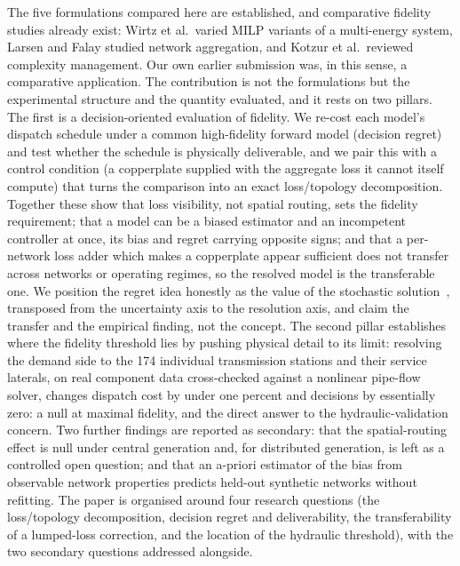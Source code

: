 \documentclass[a4paper,fleqn]{cas-sc}
\providecommand{\citep}[1]{\cite{#1}}
\begin{document}
The five formulations compared here are established, and comparative fidelity studies
already exist: Wirtz et al.\ varied MILP variants of a multi-energy system, Larsen and
Falay studied network aggregation, and Kotzur et al.\ reviewed complexity management. Our
own earlier submission was, in this sense, a comparative application. The contribution is
not the formulations but the experimental structure and the quantity evaluated, and it
rests on two pillars. The first is a decision-oriented evaluation of fidelity. We re-cost
each model's dispatch schedule under a common high-fidelity forward model (decision regret)
and test whether the schedule is physically deliverable, and we pair this with a control
condition (a copperplate supplied with the aggregate loss it cannot itself compute)
that turns the comparison into an exact loss/topology decomposition. Together these show
that loss visibility, not spatial routing, sets the fidelity requirement; that a model can
be a biased estimator and an incompetent controller at once, its bias and regret carrying
opposite signs; and that a per-network loss adder which makes a copperplate appear
sufficient does not transfer across networks or operating regimes, so the resolved model is
the transferable one. We position the regret idea honestly as the value of the stochastic
solution~\citep{BirgeLouveaux2011}, transposed from the uncertainty axis to the resolution
axis, and claim the transfer and the empirical finding, not the concept. The second pillar establishes where the fidelity
threshold lies by pushing physical detail to its limit: resolving the demand side to the 174
individual transmission stations and their service laterals, on real component data
cross-checked against a nonlinear pipe-flow solver, changes dispatch cost by under one
percent and decisions by essentially zero: a null at maximal fidelity, and the direct
answer to the hydraulic-validation concern. Two further findings are reported as secondary:
that the spatial-routing effect is null under central generation and, for distributed
generation, is left as a controlled open question; and that an a-priori estimator of the
bias from observable network properties predicts held-out synthetic networks without
refitting. The paper is organised around four research questions (the loss/topology
decomposition, decision regret and deliverability, the transferability of a lumped-loss
correction, and the location of the hydraulic threshold), with the two secondary questions
addressed alongside.
\end{document}
